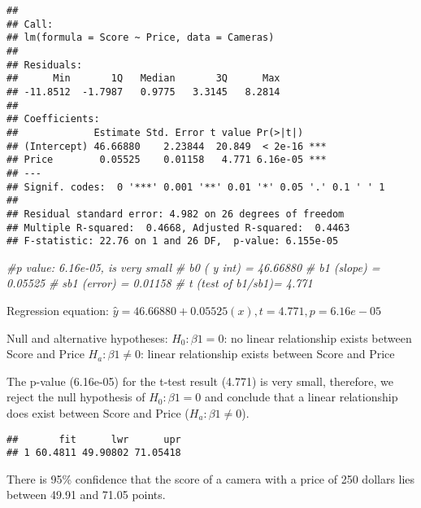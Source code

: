 \documentclass[
]{article}
\newenvironment{Shaded}{\begin{snugshade}}{\end{snugshade}}
\newcommand{\AttributeTok}[1]{\textcolor[rgb]{0.13,0.29,0.53}{#1}}
\newcommand{\CommentTok}[1]{\textcolor[rgb]{0.56,0.35,0.01}{\textit{#1}}}
\newcommand{\DecValTok}[1]{\textcolor[rgb]{0.00,0.00,0.81}{#1}}
\newcommand{\FunctionTok}[1]{\textcolor[rgb]{0.13,0.29,0.53}{\textbf{#1}}}
\newcommand{\NormalTok}[1]{#1}
\newcommand{\OtherTok}[1]{\textcolor[rgb]{0.56,0.35,0.01}{#1}}
\newcommand{\StringTok}[1]{\textcolor[rgb]{0.31,0.60,0.02}{#1}}
\begin{document}
\begin{verbatim}
## 
## Call:
## lm(formula = Score ~ Price, data = Cameras)
## 
## Residuals:
##      Min       1Q   Median       3Q      Max 
## -11.8512  -1.7987   0.9775   3.3145   8.2814 
## 
## Coefficients:
##             Estimate Std. Error t value Pr(>|t|)    
## (Intercept) 46.66880    2.23844  20.849  < 2e-16 ***
## Price        0.05525    0.01158   4.771 6.16e-05 ***
## ---
## Signif. codes:  0 '***' 0.001 '**' 0.01 '*' 0.05 '.' 0.1 ' ' 1
## 
## Residual standard error: 4.982 on 26 degrees of freedom
## Multiple R-squared:  0.4668, Adjusted R-squared:  0.4463 
## F-statistic: 22.76 on 1 and 26 DF,  p-value: 6.155e-05
\end{verbatim}

\begin{Shaded}
\begin{Highlighting}[]
    \CommentTok{\#p value: 6.16e{-}05, is very small }
     \CommentTok{\# b0 ( y int) = 46.66880}
     \CommentTok{\# b1 (slope) = 0.05525}
     \CommentTok{\# sb1 (error) = 0.01158}
     \CommentTok{\# t (test of b1/sb1)= 4.771}
\end{Highlighting}
\end{Shaded}

Regression equation:
\(𝑦̂ = 46.66880 + 0.05525(𝑥), 𝑡 = 4.771, p = 6.16e-05\)

Null and alternative hypotheses: \(H_0: 𝛽1 = 0\): no linear relationship
exists between Score and Price \(H_a: 𝛽1 ≠ 0\): linear relationship
exists between Score and Price

The p-value (6.16e-05) for the t-test result (4.771) is very small,
therefore, we reject the null hypothesis of \(H_0: 𝛽1 = 0\) and conclude
that a linear relationship does exist between Score and Price
(\(H_a: 𝛽1 ≠ 0\)).

\begin{Shaded}
\end{Shaded}

\begin{verbatim}
##       fit      lwr      upr
## 1 60.4811 49.90802 71.05418
\end{verbatim}

There is 95\% confidence that the score of a camera with a price of 250
dollars lies between 49.91 and 71.05 points.
\end{document}
